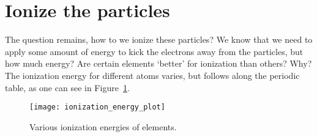 \section{Ionize the particles}\label{sec:ionize-the-particles}

The question remains, how to we ionize these particles?
We know that we need to apply some amount of energy to kick the electrons away from the particles, but how much energy?
Are certain elements `better' for ionization than others? Why?
The ionization energy for different atoms varies, but follows along the periodic table, as one can see in Figure~\ref{fig:ionization_graph}.

\begin{figure}
	\centering
	\texttt{[image: ionization\_energy\_plot]}
	\caption{Various ionization energies of elements.}
	\label{fig:ionization_graph}
\end{figure}


